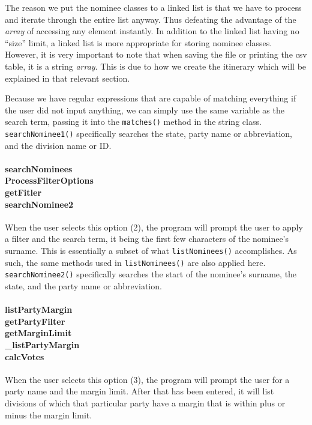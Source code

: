 \documentclass[a4paper, 12pt, titlepage]{article}
\newcommand{\code}[1]{\small\texttt{#1}\normalsize}
\begin{document}
The reason we put the nominee classes to a linked list is that we have
to process and iterate through the entire list anyway. Thus defeating the
advantage of the \textit{array} of accessing any element instantly. In
addition to the linked list having no ``size'' limit, a linked list is more
appropriate for storing nominee classes. However, it is very important to note
that when saving the file or printing the csv table, it is a string
\textit{array}. This is due to how we create the itinerary which will be
explained in that relevant section.

Because we have regular expressions that are capable of matching everything
if the user did not input anything, we can simply use the same variable as the
search term, passing it into the \code{matches()} method in the string class.
\code{searchNominee1()} specifically searches the state, party name or
abbreviation, and the division name or ID.

\pagebreak
\paragraph{searchNominees \\
           ProcessFilterOptions \\
           getFitler \\
           searchNominee2
} \hspace{0pt}

When the user selects this option (2), the program will prompt the user
to apply a filter and the search term, it being the first few characters
of the nominee's surname. This is essentially a subset of what
\code{listNominees()} accomplishes. As such, the same methods used in
\code{listNominees()} are also applied here. \code{searchNominee2()}
specifically searches the start of the nominee's surname, the state, and the
party name or abbreviation.

\paragraph{listPartyMargin \\
           getPartyFilter \\
           getMarginLimit \\
           \_listPartyMargin \\
           calcVotes
} \hspace{0pt}

When the user selects this option (3), the program will prompt the user
for a party name and the margin limit. After that has been entered, it will
list divisions of which that particular party have a margin that is within
plus or minus the margin limit.
\end{document}

